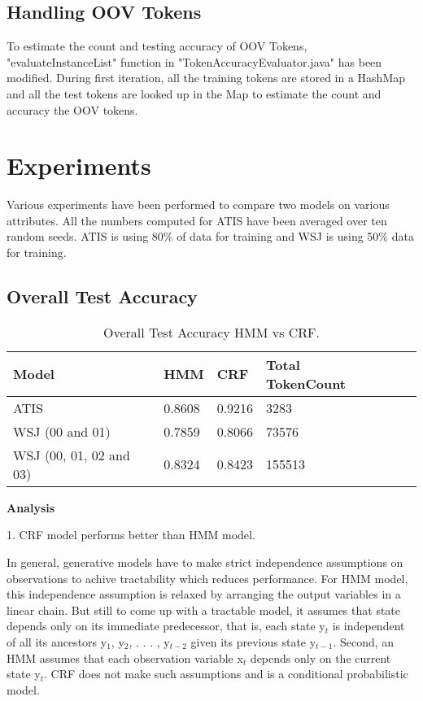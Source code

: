\subsection {Handling OOV Tokens}

To estimate the count and testing accuracy of OOV Tokens, "evaluateInstanceList" function in "TokenAccuracyEvaluator.java" has been modified. During first iteration, all the training tokens are stored in a HashMap and all the test tokens are looked up in the Map to estimate the count and accuracy the OOV tokens.

\section {Experiments}

Various experiments have been performed to compare two models on various attributes. All the numbers computed for ATIS have been averaged over ten random seeds. ATIS is using 80\% of data for training and WSJ is using 50\% data for training. 

\subsection {Overall Test Accuracy}

\begin{center}	
	\begin{table}[ht]
  	\centering
   	\begin{tabular}{| l | l | l | l | l | l |}
    	\hline
        Model & HMM & CRF & Total TokenCount \\ \hline
        ATIS & 0.8608 & 0.9216 &  3283 \\ \hline
        WSJ (00 and 01) & 0.7859 & 0.8066 & 73576 \\ \hline
	WSJ (00, 01, 02 and 03) & 0.8324 & 0.8423 & 155513 \\ \hline
    	\end{tabular}
    	\caption{Overall Test Accuracy HMM vs CRF. }
    	\end{table}%
\end{center}

{\bfseries Analysis}

1. CRF model performs better than HMM model.

In general, generative models have to make strict independence assumptions on observations to achive tractability which reduces performance. For HMM model, this independence assumption is relaxed by arranging the output variables in a linear chain. But still to come up with a tractable model, it assumes that  state depends only on its immediate predecessor, that is, each state y$_t$ is independent of all its ancestors y$_1$, y$_2$, . . . , y$_{t-2}$ given its previous state y$_{t-1}$. Second, an HMM assumes that each observation variable x$_t$ depends only on the current state y$_t$. CRF does not make such assumptions and is a conditional probabilistic model.

